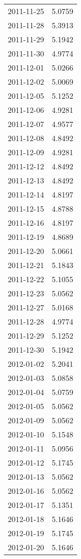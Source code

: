 \begin{tabular}{lr}
2011-11-25 &      5.0759 \\
2011-11-28 &      5.3913 \\
2011-11-29 &      5.1942 \\
2011-11-30 &      4.9774 \\
2011-12-01 &      5.0266 \\
2011-12-02 &      5.0069 \\
2011-12-05 &      5.1252 \\
2011-12-06 &      4.9281 \\
2011-12-07 &      4.9577 \\
2011-12-08 &      4.8492 \\
2011-12-09 &      4.9281 \\
2011-12-12 &      4.8492 \\
2011-12-13 &      4.8492 \\
2011-12-14 &      4.8197 \\
2011-12-15 &      4.8788 \\
2011-12-16 &      4.8197 \\
2011-12-19 &      4.8689 \\
2011-12-20 &      5.0661 \\
2011-12-21 &      5.1843 \\
2011-12-22 &      5.1055 \\
2011-12-23 &      5.0562 \\
2011-12-27 &      5.0168 \\
2011-12-28 &      4.9774 \\
2011-12-29 &      5.1252 \\
2011-12-30 &      5.1942 \\
2012-01-02 &      5.2041 \\
2012-01-03 &      5.0858 \\
2012-01-04 &      5.0759 \\
2012-01-05 &      5.0562 \\
2012-01-09 &      5.0562 \\
2012-01-10 &      5.1548 \\
2012-01-11 &      5.0956 \\
2012-01-12 &      5.1745 \\
2012-01-13 &      5.0562 \\
2012-01-16 &      5.0562 \\
2012-01-17 &      5.1351 \\
2012-01-18 &      5.1646 \\
2012-01-19 &      5.1745 \\
2012-01-20 &      5.1646 \\

\end{tabular}

